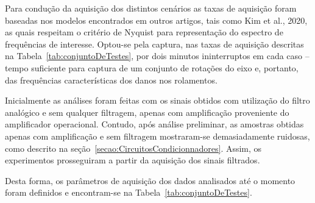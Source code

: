 \documentclass[
	12pt,				
	oneside,			
	a4paper,			
	english,			
	brazil,			
	]{abntex2ppgsi}
\begin{document}


Para condução da aquisição dos distintos cenários as taxas de aquisição foram baseadas nos modelos encontrados em outros artigos, tais como Kim et al., 2020, as quais respeitam o critério de Nyquist para representação do espectro de frequências de interesse. Optou-se pela captura, nas taxas de aquisição descritas na Tabela~\ref{tab:conjuntoDeTestes}, por dois minutos ininterruptos em cada caso – tempo suficiente para captura de um conjunto de rotações do eixo e, portanto, das frequências características dos danos nos rolamentos. 

Inicialmente as análises foram feitas com os sinais obtidos com utilização do filtro analógico e sem qualquer filtragem, apenas com amplificação proveniente do amplificador operacional. Contudo, após análise preliminar, as amostras obtidas apenas com amplificação e sem filtragem mostraram-se demasiadamente ruidosas, como descrito na seção~\ref{secao:CircuitosCondicionnadores}. Assim, os experimentos prosseguiram a partir da aquisição dos sinais filtrados.

Desta forma, os parâmetros de aquisição dos dados analisados até o momento foram definidos e encontram-se na Tabela~\ref{tab:conjuntoDeTestes}.
\end{document}
